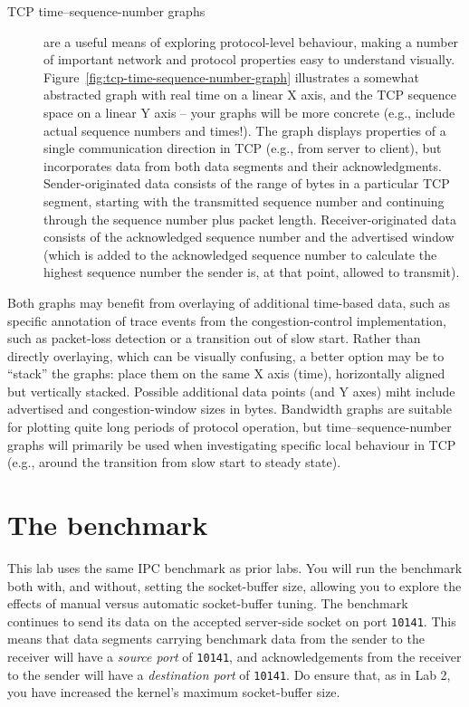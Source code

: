 \documentclass[a4paper,10pt]{article}
\begin{document}
\begin{description}
\item[TCP time--sequence-number graphs] are a useful means of exploring
  protocol-level behaviour, making a number of important network and protocol
  properties easy to understand visually.
  Figure~\ref{fig:tcp-time-sequence-number-graph} illustrates a somewhat
  abstracted graph with real time on a linear X axis, and the TCP sequence
  space on a linear Y axis -- your graphs will be more concrete (e.g., include
  actual sequence numbers and times!).
  The graph displays properties of a single communication direction in TCP
  (e.g., from server to client), but incorporates data from both data segments
  and their acknowledgments.
  Sender-originated data consists of the range of bytes in a particular TCP
  segment, starting with the transmitted sequence number and continuing
  through the sequence number plus packet length.
  Receiver-originated data consists of the acknowledged sequence number and
  the advertised window (which is added to the acknowledged sequence number
  to calculate the highest sequence number the sender is, at that point,
  allowed to transmit).
\end{description}

Both graphs may benefit from overlaying of additional time-based data, such as
specific annotation of trace events from the congestion-control
implementation, such as packet-loss detection or a transition out of slow
start.
Rather than directly overlaying, which can be visually confusing, a better
option may be to ``stack'' the graphs: place them on the same X axis (time),
horizontally aligned but vertically stacked.
Possible additional data points (and Y axes) miht include advertised and
congestion-window sizes in bytes.
Bandwidth graphs are suitable for plotting quite long periods of protocol
operation, but time--sequence-number graphs will primarily be used when
investigating specific local behaviour in TCP (e.g., around the transition
from slow start to steady state).

\section*{The benchmark}

This lab uses the same IPC benchmark as prior labs.
You will run the benchmark both with, and without, setting the socket-buffer
size, allowing you to explore the effects of manual versus automatic
socket-buffer tuning.
The benchmark continues to send its data on the accepted server-side socket on
port \texttt{10141}.
This means that data segments carrying benchmark data from the sender to the
receiver will have a \textit{source port} of \texttt{10141}, and
acknowledgements from the receiver to the sender will have a
\textit{destination port} of \texttt{10141}.
Do ensure that, as in Lab 2, you have increased the kernel's maximum 
socket-buffer size.
\end{document}
